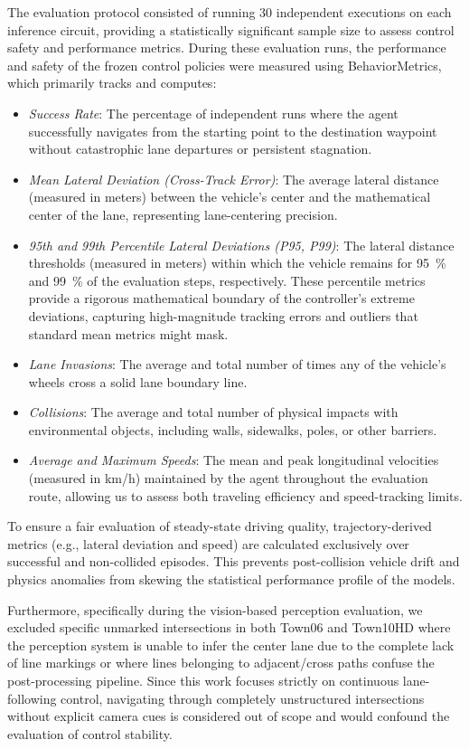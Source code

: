 \documentclass[sn-mathphys,Numbered]{sn-jnl}
\begin{document}
The evaluation protocol consisted of running 30 independent executions on each inference circuit, providing a statistically significant sample size to assess control safety and performance metrics. During these evaluation runs, the performance and safety of the frozen control policies were measured using BehaviorMetrics, which primarily tracks and computes:
\begin{itemize}
    \item \textit{Success Rate}: The percentage of independent runs where the agent successfully navigates from the starting point to the destination waypoint without catastrophic lane departures or persistent stagnation.
    \item \textit{Mean Lateral Deviation (Cross-Track Error)}: The average lateral distance (measured in meters) between the vehicle's center and the mathematical center of the lane, representing lane-centering precision.
    \item \textit{95th and 99th Percentile Lateral Deviations (P95, P99)}: The lateral distance thresholds (measured in meters) within which the vehicle remains for \SI{95}{\%} and \SI{99}{\%} of the evaluation steps, respectively. These percentile metrics provide a rigorous mathematical boundary of the controller's extreme deviations, capturing high-magnitude tracking errors and outliers that standard mean metrics might mask.
    \item \textit{Lane Invasions}: The average and total number of times any of the vehicle's wheels cross a solid lane boundary line.
    \item \textit{Collisions}: The average and total number of physical impacts with environmental objects, including walls, sidewalks, poles, or other barriers.
    \item \textit{Average and Maximum Speeds}: The mean and peak longitudinal velocities (measured in km/h) maintained by the agent throughout the evaluation route, allowing us to assess both traveling efficiency and speed-tracking limits.
\end{itemize}

To ensure a fair evaluation of steady-state driving quality, trajectory-derived metrics (e.g., lateral deviation and speed) are calculated exclusively over successful and non-collided episodes. This prevents post-collision vehicle drift and physics anomalies from skewing the statistical performance profile of the models.

Furthermore, specifically during the vision-based perception evaluation, we excluded specific unmarked intersections in both Town06 and Town10HD where the perception system is unable to infer the center lane due to the complete lack of line markings or where lines belonging to adjacent/cross paths confuse the post-processing pipeline. Since this work focuses strictly on continuous lane-following control, navigating through completely unstructured intersections without explicit camera cues is considered out of scope and would confound the evaluation of control stability.
\end{document}
